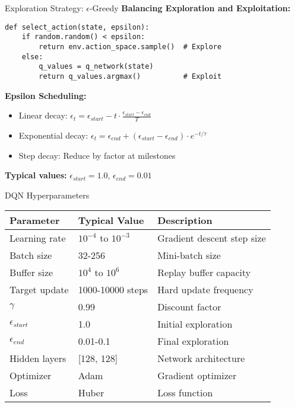 \documentclass[aspectratio=169,10pt]{beamer}
\begin{document}
\begin{frame}[fragile]{Exploration Strategy: $\epsilon$-Greedy}
\textbf{Balancing Exploration and Exploitation:}
\begin{lstlisting}
def select_action(state, epsilon):
    if random.random() < epsilon:
        return env.action_space.sample()  # Explore
    else:
        q_values = q_network(state)
        return q_values.argmax()          # Exploit
\end{lstlisting}

\vspace{0.3cm}
\textbf{Epsilon Scheduling:}
\begin{itemize}
    \item Linear decay: $\epsilon_t = \epsilon_{start} - t \cdot \frac{\epsilon_{start} - \epsilon_{end}}{T}$
    \item Exponential decay: $\epsilon_t = \epsilon_{end} + (\epsilon_{start} - \epsilon_{end}) \cdot e^{-t/\tau}$
    \item Step decay: Reduce by factor at milestones
\end{itemize}

\textbf{Typical values:} $\epsilon_{start} = 1.0$, $\epsilon_{end} = 0.01$
\end{frame}

\begin{frame}{DQN Hyperparameters}
\begin{table}
\small
\begin{tabular}{l|l|l}
\hline
\textbf{Parameter} & \textbf{Typical Value} & \textbf{Description} \\
\hline
Learning rate & $10^{-4}$ to $10^{-3}$ & Gradient descent step size \\
Batch size & 32-256 & Mini-batch size \\
Buffer size & $10^4$ to $10^6$ & Replay buffer capacity \\
Target update & 1000-10000 steps & Hard update frequency \\
$\gamma$ & 0.99 & Discount factor \\
$\epsilon_{start}$ & 1.0 & Initial exploration \\
$\epsilon_{end}$ & 0.01-0.1 & Final exploration \\
Hidden layers & [128, 128] & Network architecture \\
Optimizer & Adam & Gradient optimizer \\
Loss & Huber & Loss function \\
\hline
\end{tabular}
\end{table}
\end{frame}
\end{document}
